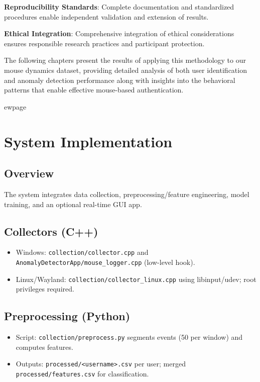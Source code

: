 \documentclass[
  11pt,
  a4paper,
]{article}
\providecommand{\tightlist}{%
  \setlength{\itemsep}{0pt}\setlength{\parskip}{0pt}}
\begin{document}
\textbf{Reproducibility Standards}: Complete documentation and
standardized procedures enable independent validation and extension of
results.

\textbf{Ethical Integration}: Comprehensive integration of ethical
considerations ensures responsible research practices and participant
protection.

The following chapters present the results of applying this methodology
to our mouse dynamics dataset, providing detailed analysis of both user
identification and anomaly detection performance along with insights
into the behavioral patterns that enable effective mouse-based
authentication.

ewpage

\section{System Implementation}\label{system-implementation}

\subsection{Overview}\label{overview}

The system integrates data collection, preprocessing/feature
engineering, model training, and an optional real-time GUI app.

\subsection{Collectors (C++)}\label{collectors-c}

\begin{itemize}
\tightlist
\item
  Windows: \texttt{collection/collector.cpp} and
  \texttt{AnomalyDetectorApp/mouse\_logger.cpp} (low-level hook).
\item
  Linux/Wayland: \texttt{collection/collector\_linux.cpp} using
  libinput/udev; root privileges required.
\end{itemize}

\subsection{Preprocessing (Python)}\label{preprocessing-python}

\begin{itemize}
\tightlist
\item
  Script: \texttt{collection/preprocess.py} segments events (50 per
  window) and computes features.
\item
  Outputs: \texttt{processed/\textless{}username\textgreater{}.csv} per
  user; merged \texttt{processed/features.csv} for classification.
\end{itemize}
\end{document}
